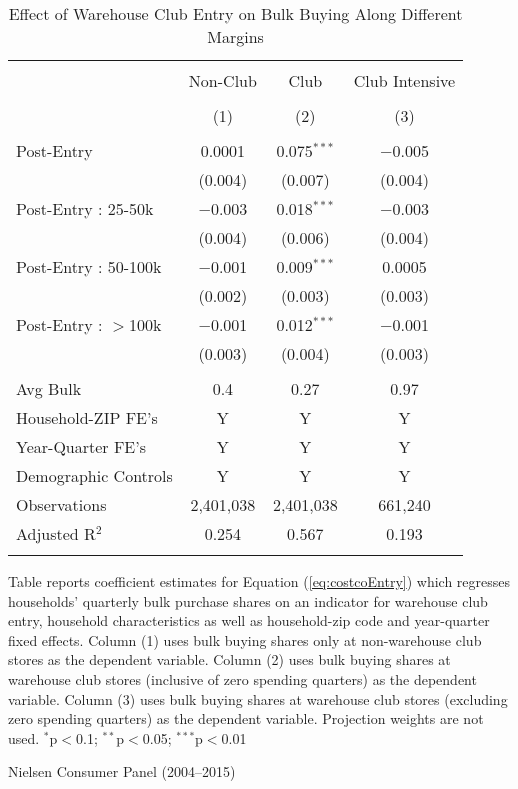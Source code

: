 \begin{table}[!htbp] \centering
  \caption{Effect of Warehouse Club Entry on Bulk Buying Along Different Margins}
  \label{tab:costcoEntryDDMargin}
\begin{tabular}{@{\extracolsep{5pt}}lccc}
\\[-1.8ex]\hline
\hline \\[-1.8ex]
 & Non-Club & Club & Club Intensive \\
\\[-1.8ex] & (1) & (2) & (3)\\
\hline \\[-1.8ex]
 Post-Entry & 0.0001 & 0.075$^{***}$ & $-$0.005 \\
  & (0.004) & (0.007) & (0.004) \\
  Post-Entry : 25-50k & $-$0.003 & 0.018$^{***}$ & $-$0.003 \\
  & (0.004) & (0.006) & (0.004) \\
  Post-Entry : 50-100k & $-$0.001 & 0.009$^{***}$ & 0.0005 \\
  & (0.002) & (0.003) & (0.003) \\
  Post-Entry : $>$100k & $-$0.001 & 0.012$^{***}$ & $-$0.001 \\
  & (0.003) & (0.004) & (0.003) \\
 \hline \\[-1.8ex]
Avg Bulk & 0.4 & 0.27 & 0.97 \\
Household-ZIP FE's & Y & Y & Y \\
Year-Quarter FE's & Y & Y & Y \\
Demographic Controls & Y & Y & Y \\
Observations & 2,401,038 & 2,401,038 & 661,240 \\
Adjusted R$^{2}$ & 0.254 & 0.567 & 0.193 \\
\hline
\hline \\[-1.8ex]
\end{tabular}
\begin{tablenotes}
Table reports coefficient estimates for Equation (\ref{eq:costcoEntry}) which regresses households' quarterly bulk purchase shares on an indicator for warehouse club entry, household characteristics as well as household-zip code and year-quarter fixed effects. Column (1) uses bulk buying shares only at non-warehouse club stores as the dependent variable. Column (2) uses bulk buying shares at warehouse club stores (inclusive of zero spending quarters) as the dependent variable. Column (3) uses bulk buying shares at warehouse club stores (excluding zero spending quarters) as the dependent variable. Projection weights are not used. $^{*}$p$<$0.1; $^{**}$p$<$0.05; $^{***}$p$<$0.01
\end{tablenotes}
\begin{tablenotes}[Source]
Nielsen Consumer Panel (2004--2015)
\end{tablenotes}
\end{table}
